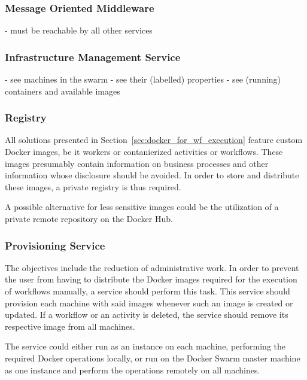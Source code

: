     \subsubsection{Message Oriented Middleware} %
      \label{subs:message_oriented_middleware}
      - must be reachable by all other services

    \subsubsection{Infrastructure Management Service} %
      \label{subs:environment_management_service}

        - see machines in the swarm
        - see their (labelled) properties
        - see (running) containers and available images

    \subsubsection{Registry} %
    \label{subs:registry}
      All solutions presented in Section~\ref{sec:docker_for_wf_execution} feature custom Docker images, be it workers or contanierized activities or workflows. These images presumably contain information on business processes and other information whose disclosure should be avoided.  In order to store and distribute these images, a private registry is thus required.

      A possible alternative for less sensitive images could be the utilization of a private remote repository on the Docker Hub.

    \subsubsection{Provisioning Service} %
      \label{subs:provisioning_service}
        The objectives include the reduction of administrative work. In order to prevent the user from having to distribute the Docker images required for the execution of workflows manually, a service should perform this task. This service should provision each machine with said images whenever such an image is created or updated. If a workflow or an activity is deleted, the service should remove its respective image from all machines.

        The service could either run as an instance on each machine, performing the required Docker operations locally, or run on the Docker Swarm master machine as one instance and perform the operations remotely on all machines.

